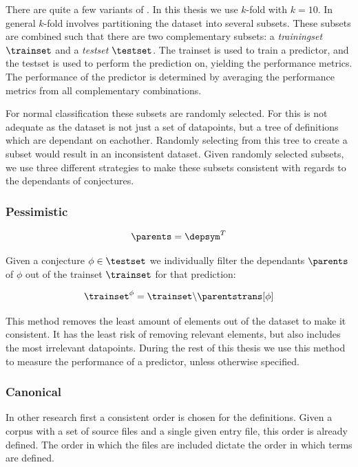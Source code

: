 There are quite a few variants of \crossvalidation.
In this thesis we use $k$-fold \crossvalidation with $k = 10$.
In general $k$-fold \crossvalidation involves partitioning the dataset into several subsets.
These subsets are combined such that there are two complementary subsets: a \emph{trainingset} $\trainset$ and a \emph{testset} $\testset$.
The trainset is used to train a predictor, and the testset is used to perform the prediction on, yielding the performance metrics.
The performance of the predictor is determined by averaging the performance metrics from all complementary combinations.


For normal classification these subsets are randomly selected.
For \premiseselection this is not adequate as the dataset is not just a set of datapoints, but a tree of definitions which are dependant on eachother.
Randomly selecting from this tree to create a subset would result in an inconsistent dataset.
Given randomly selected subsets, we use three different strategies to make these subsets consistent with regards to the dependants of conjectures.

\subsubsection{Pessimistic}
\begin{definition}
  \[
    \parents = \depsym^{T}
  \]
\end{definition}

Given a conjecture $\phi \in \testset$ we individually filter the dependants $\parents$ of $\phi$ out of the trainset $\trainset$ for that prediction:
\begin{definition}
  \[
    \trainset^{\phi} = \trainset \backslash \parentstrans[\phi]
  \]
\end{definition}
This method removes the least amount of elements out of the dataset to make it consistent.
It has the least risk of removing relevant elements, but also includes the most irrelevant datapoints.
During the rest of this thesis we use this method to measure the performance of a predictor, unless otherwise specified.

\subsubsection{Canonical}
In other research first a consistent order is chosen for the definitions.
Given a corpus with a set of source files and a single given entry file, this order is already defined.
The order in which the files are included dictate the order in which terms are defined.

